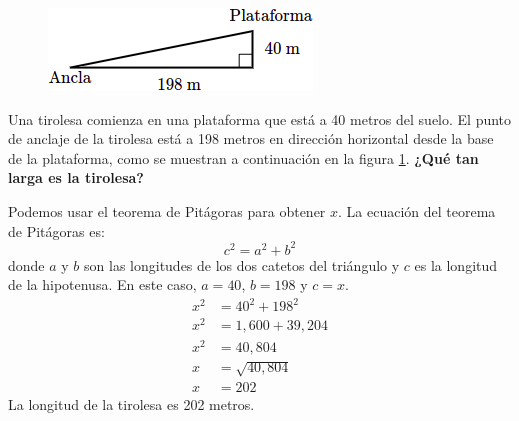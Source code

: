 \begin{figure}
    \centering
    \includegraphics[width=\linewidth]{../images/proverb_pitagoras_03.png}
    \caption{}
    \label{fig:proverb_pitagoras_03}
\end{figure}
Una tirolesa comienza en una plataforma que está a 40 metros del suelo.
El punto de anclaje de la tirolesa está a 198 metros en dirección horizontal desde la base de la plataforma, como se muestran a continuación en la figura \ref{fig:proverb_pitagoras_03}.
\textbf{¿Qué tan larga es la tirolesa?}
\vspace{2cm}
\begin{solutionbox}{5.5cm}\footnotesize
    Podemos usar el teorema de Pitágoras para obtener $x$.
    La ecuación del teorema de Pitágoras es:
    \[c^2=a^2+b^2\]
    donde $a$ y $b$ son las longitudes de los dos catetos del triángulo y $c$ es la longitud de la hipotenusa.
    En este caso, $a=40$, $b=198$ y $c=x$.
    \begin{align*}
        x^2 & =40^2+198^2     \\
        x^2 & =1,600 + 39,204 \\
        x^2 & =40,804         \\
        x   & =\sqrt{40,804}  \\
        x   & = 202
    \end{align*}
    La longitud de la tirolesa es 202 metros.
\end{solutionbox}